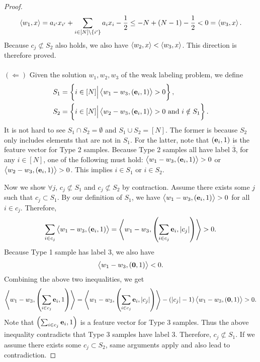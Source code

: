 \begin{proof}
 \begin{align*}
     \left\langle w_1, x \right\rangle= a_{i'}x_{i'} + \sum_{i\in [N]\backslash\{i'\}} a_ix_i - \frac{1}{2} \leq -N + (N-1)-\frac{1}{2} < 0 = \left\langle w_3, x \right\rangle. 
 \end{align*}
 Because $c_j \not\subset S_2$ also holds, we also have $\left\langle w_2, x \right\rangle<\left\langle w_3, x \right\rangle$. This direction is therefore proved. \\
 \ \\
 $(\Longleftarrow)$ Given the solution $w_1, w_2, w_3$ of the weak labeling problem, we define 
 \begin{align*}
     S_1 &= \left\{i\in [N] \Big| \left\langle w_1-w_3, (\mathbf{e}_i, 1) \right\rangle > 0 \right\}, \\
     S_2 &= \left\{i\in [N] \Big| \left\langle w_2-w_3, (\mathbf{e}_i, 1) \right\rangle > 0 \text{\ and\ } i\notin S_1 \right\}.
 \end{align*}
 It is not hard to see $S_1 \cap S_2 = \emptyset$ and $S_1\cup S_2 = [N]$. The former is because $S_2$ only includes elements that are not in $S_1$. For the latter, note that $(\mathbf{e}_i, 1)$ is the feature vector for Type 2 samples. Because Type 2 samples all have label $\overline{3}$, for any $i\in [N]$, one of the following must hold: $\left\langle w_1-w_3, (\mathbf{e}_i, 1) \right\rangle>0$ or $\left\langle w_2-w_3, (\mathbf{e}_i, 1) \right\rangle>0$. This implies $i\in S_1$ or $i\in S_2$. 
 
 Now we show $\forall j$, $c_j \not\subset S_1$ and $c_j \not\subset S_2$ by contraction. Assume there exists some $j$ such that $c_j \subset S_1$. By our definition of $S_1$, we have $\left\langle w_1-w_3, (\mathbf{e}_i, 1) \right\rangle > 0$ for all $i\in c_j$. Therefore, 
 \begin{align*}
     \sum_{i\in c_j}\left\langle w_1-w_3, \left(\mathbf{e}_i, 1\right) \right\rangle = \left\langle w_1-w_3, \left(\sum_{i\in c_j}\mathbf{e}_i, |c_j|\right) \right\rangle > 0. 
 \end{align*}
 Because Type 1 sample has label $3$, we also have
 \begin{align*}
     \left\langle w_1-w_3, \left(\mathbf{0}, 1\right) \right\rangle < 0. 
 \end{align*}
 Combining the above two inequalities, we get
 \begin{align*}
     \left\langle w_1-w_3, \left(\sum_{i\in c_j}\mathbf{e}_i, 1\right) \right\rangle = \left\langle w_1-w_3, \left(\sum_{i\in c_j}\mathbf{e}_i, |c_j|\right) \right\rangle - (|c_j|-1)\left\langle w_1-w_3, \left(\mathbf{0}, 1\right) \right\rangle>0.  
 \end{align*}
 Note that $\left(\sum_{i\in c_j}\mathbf{e}_i, 1\right)$ is a feature vector for Type 3 samples. Thus the above inequality contradicts that Type 3 samples have label 3. Therefore, $c_j \not\subset S_1$. If we assume there exists some $c_j \subset S_2$, same arguments apply and also lead to contradiction. 
\end{proof}